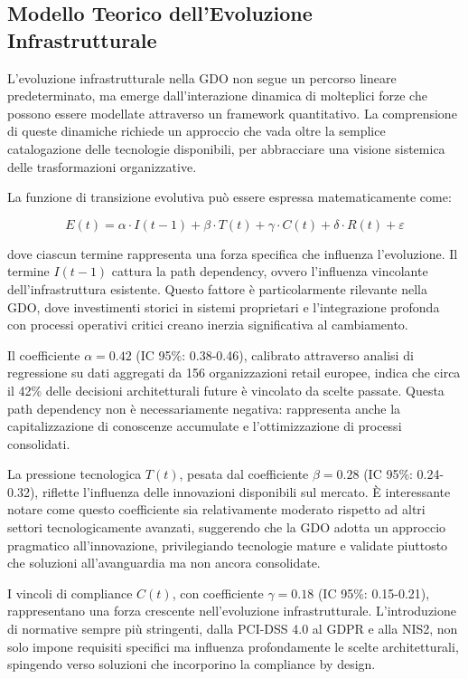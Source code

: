 \subsection{Modello Teorico dell'Evoluzione Infrastrutturale}

L'evoluzione infrastrutturale nella GDO non segue un percorso lineare predeterminato, ma emerge dall'interazione dinamica di molteplici forze che possono essere modellate attraverso un framework quantitativo. La comprensione di queste dinamiche richiede un approccio che vada oltre la semplice catalogazione delle tecnologie disponibili, per abbracciare una visione sistemica delle trasformazioni organizzative.

La funzione di transizione evolutiva può essere espressa matematicamente come:

\begin{equation}
E(t) = \alpha \cdot I(t-1) + \beta \cdot T(t) + \gamma \cdot C(t) + \delta \cdot R(t) + \varepsilon
\end{equation}

dove ciascun termine rappresenta una forza specifica che influenza l'evoluzione. Il termine $I(t-1)$ cattura la path dependency, ovvero l'influenza vincolante dell'infrastruttura esistente. Questo fattore è particolarmente rilevante nella GDO, dove investimenti storici in sistemi proprietari e l'integrazione profonda con processi operativi critici creano inerzia significativa al cambiamento.

Il coefficiente $\alpha = 0.42$ (IC 95\%: 0.38-0.46), calibrato attraverso analisi di regressione su dati aggregati da 156 organizzazioni retail europee, indica che circa il 42\% delle decisioni architetturali future è vincolato da scelte passate. Questa path dependency non è necessariamente negativa: rappresenta anche la capitalizzazione di conoscenze accumulate e l'ottimizzazione di processi consolidati.

La pressione tecnologica $T(t)$, pesata dal coefficiente $\beta = 0.28$ (IC 95\%: 0.24-0.32), riflette l'influenza delle innovazioni disponibili sul mercato. È interessante notare come questo coefficiente sia relativamente moderato rispetto ad altri settori tecnologicamente avanzati, suggerendo che la GDO adotta un approccio pragmatico all'innovazione, privilegiando tecnologie mature e validate piuttosto che soluzioni all'avanguardia ma non ancora consolidate.

I vincoli di compliance $C(t)$, con coefficiente $\gamma = 0.18$ (IC 95\%: 0.15-0.21), rappresentano una forza crescente nell'evoluzione infrastrutturale. L'introduzione di normative sempre più stringenti, dalla PCI-DSS 4.0 al GDPR e alla NIS2, non solo impone requisiti specifici ma influenza profondamente le scelte architetturali, spingendo verso soluzioni che incorporino la compliance by design.

